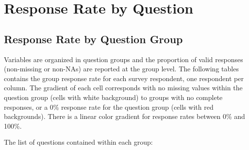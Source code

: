 \documentclass[
  letterpaper,
]{scrbook}
\begin{document}
\chapter{Response Rate by Question}\label{response-rate-by-question}

\section{Response Rate by Question
Group}\label{response-rate-by-question-group}

Variables are organized in question groups and the proportion of valid
responses (non-missing or non-NAs) are reported at the group level. The
following tables contains the group response rate for each survey
respondent, one respondent per column. The gradient of each cell
corresponds with no missing values within the question group (cells with
white background) to groups with no complete responses, or a 0\%
response rate for the question group (cells with red backgrounds). There
is a linear color gradient for response rates between 0\% and 100\%.

The list of questions contained within each group:
\end{document}
